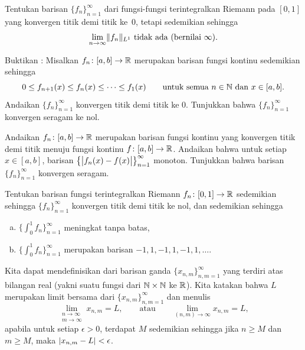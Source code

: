 \begin{exercise}
Tentukan barisan $\{ f_n \}_{n=1}^\infty$ dari fungsi-fungsi terintegralkan Riemann
pada $[0,1]$ yang konvergen titik demi titik ke~$0$, tetapi sedemikian sehingga
\begin{equation*}
\lim_{n\to\infty} \lVert {f_n} \rVert_{L^1} \text{ tidak ada (bernilai } \infty\text{)}.
\end{equation*}
\end{exercise}

\begin{exercise}[Sulit] \label{exercise:dinisthm}
Buktikan \emph{}:
Misalkan $f_n \colon [a,b] \to {\mathbb{R}}$ merupakan barisan fungsi kontinu sedemikian sehingga
\begin{equation*}
0 \leq f_{n+1}(x) \leq f_n(x) \leq \cdots \leq f_1(x) 
\qquad \text{untuk semua } n \in {\mathbb{N}} \text{ dan } x \in [a,b].
\end{equation*}
Andaikan $\{ f_n \}_{n=1}^\infty$ konvergen titik demi titik ke $0$.
Tunjukkan bahwa $\{ f_n \}_{n=1}^\infty$ konvergen seragam ke nol.
\end{exercise}

\begin{exercise}
Andaikan $f_n \colon [a,b] \to {\mathbb{R}}$ merupakan barisan fungsi
kontinu yang
konvergen titik demi titik
menuju fungsi kontinu $f \colon [a,b] \to {\mathbb{R}}$.  Andaikan bahwa
untuk setiap $x \in [a,b]$,
barisan $\bigl\{ \bigl\lvert {f_n(x)-f(x)} \bigr\rvert \bigr\}_{n=1}^\infty$ monoton.
Tunjukkan bahwa barisan $\{f_n\}_{n=1}^\infty$ konvergen seragam.
\end{exercise}

\begin{exercise}
\pagebreak[3]
Tentukan barisan fungsi terintegralkan Riemann $f_n \colon [0,1] \to {\mathbb{R}}$ sedemikian
sehingga $\{ f_n \}_{n=1}^\infty$ konvergen titik demi titik ke nol, dan sedemikian sehingga
\begin{enumerate}[a)]
\item
$\bigl\{ \int_0^1 f_n \bigr\}_{n=1}^\infty$ meningkat tanpa batas,
\item
$\bigl\{ \int_0^1 f_n \bigr\}_{n=1}^\infty$ merupakan barisan $-1,1,-1,1,-1,1, \ldots$.
\end{enumerate}
\end{exercise}

\begin{exnote}
Kita dapat mendefinisikan
\emph{} dari barisan ganda
$\{ x_{n,m} \}_{n,m=1}^\infty$ yang terdiri atas bilangan
real (yakni suatu fungsi dari ${\mathbb{N}} \times {\mathbb{N}}$ ke ${\mathbb{R}}$).
Kita katakan bahwa $L$ merupakan limit bersama dari $\{ x_{n,m} \}_{n,m=1}^\infty$ dan menulis
\begin{equation*}
\lim_{\substack{n\to\infty\\m\to\infty}}
x_{n,m} = L ,
\qquad
\text{atau}
\qquad
\lim_{(n,m) \to \infty}
x_{n,m} = L ,
\end{equation*}
apabila untuk setiap $\epsilon > 0$, terdapat
$M$ sedemikian sehingga jika $n \geq M$ dan $m \geq M$, maka
$\lvert {x_{n,m} - L} \rvert < \epsilon$.
\end{exnote}

